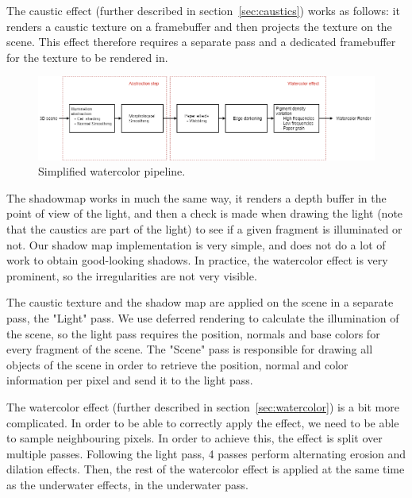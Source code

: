 \documentclass{article}
\begin{document}
\medskip \par
\noindent
The caustic effect (further described in section~\ref{sec:caustics}) works as follows: 
it renders a caustic texture on a framebuffer and then projects the texture on the scene. 
This effect therefore requires a separate pass and a dedicated framebuffer for the texture to be rendered in.

\begin{figure}[h]
    \centering
    \includegraphics[width=\linewidth]{imgs/watercolor_pipeline.png}
    \caption{Simplified watercolor pipeline.}
    \label{fig:watercolor_pipeline}
\end{figure}

\bigskip \par
\noindent
The shadowmap works in much the same way, it renders a depth buffer in the point of view of the light, 
and then a check is made when drawing the light (note that the caustics are part of the light) 
to see if a given fragment is illuminated or not. Our shadow map implementation is very simple, 
and does not do a lot of work to obtain good-looking shadows. In practice, the watercolor effect 
is very prominent, so the irregularities are not very visible.

\medskip \par
\noindent
The caustic texture and the shadow map are applied on the scene in a separate pass, the "Light" pass. 
We use deferred rendering to calculate the illumination of the scene, so the light pass requires the position, 
normals and base colors for every fragment of the scene. 
The "Scene" pass is responsible for drawing all objects of the scene in order to retrieve the position, 
normal and color information per pixel and send it to the light pass.

\medskip \par
\noindent
The watercolor effect (further described in section~\ref{sec:watercolor}) is a bit more complicated. 
In order to be able to correctly apply the effect, we need to be able to sample neighbouring pixels. 
In order to achieve this, the effect is split over multiple passes. Following the light pass, 
4 passes perform alternating erosion and dilation effects. 
Then, the rest of the watercolor effect is applied at the same time as the underwater effects, 
in the underwater pass.
\end{document}
